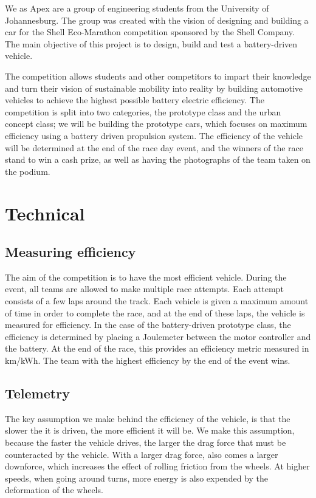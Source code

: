 \documentclass[a4paper, 12pt]{article}
\begin{document}
		We as Apex are a group of engineering students from the University of Johannesburg. The group was created with the vision of designing and building a car for the Shell Eco-Marathon competition sponsored by the Shell Company. The main objective of this project is to design, build and test a battery-driven vehicle.

		The competition allows students and other competitors to impart their knowledge and turn their vision of sustainable mobility into reality by building automotive vehicles to achieve the highest possible battery electric efficiency. The competition is split into two categories, the prototype class and the urban concept class; we will be building the prototype cars, which focuses on maximum efficiency using a battery driven propulsion system. The efficiency of the vehicle will be determined at the end of the race day event, and the winners of the race stand to win a cash prize, as well as having the photographs of the team taken on the podium.

	\section{Technical} %
	\label{sec:technical}
		\subsection{Measuring efficiency} %
		\label{sub:measuring_efficiency}
			The aim of the competition is to have the most efficient vehicle. During the event, all teams are allowed to make multiple race attempts. Each attempt consists of a few laps around the track. Each vehicle is given a maximum amount of time in order to complete the race, and at the end of these laps, the vehicle is measured for efficiency. In the case of the battery-driven prototype class, the efficiency is determined by placing a Joulemeter between the motor controller and the battery. At the end of the race, this provides an efficiency metric measured in km/kWh. The team with the highest efficiency by the end of the event wins.

		\subsection{Telemetry} %
		\label{sub:telemetry_solution}
			The key assumption we make behind the efficiency of the vehicle, is that the slower the it is driven, the more efficient it will be. We make this assumption, because the faster the vehicle drives, the larger the drag force that must be counteracted by the vehicle. With a larger drag force, also comes a larger downforce, which increases the effect of rolling friction from the wheels. At higher speeds, when going around turns, more energy is also expended by the deformation of the wheels.
\end{document}
